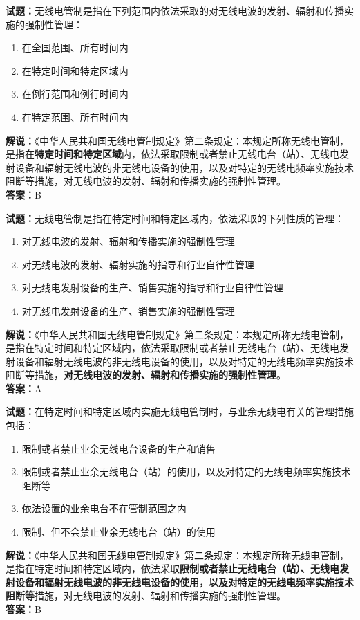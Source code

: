 \documentclass{ctexbook}
\begin{document}
\bigskip


\noindent\textbf{试题：}无线电管制是指在下列范围内依法采取的对无线电波的发射、辐射和传播实施的强制性管理：
\begin{enumerate}[leftmargin=3em]
\item 在全国范围、所有时间内
\item 在特定时间和特定区域内
\item 在例行范围和例行时间内
\item 在特定范围、所有时间内
\end{enumerate}
\noindent\textbf{解说：}《中华人民共和国无线电管制规定》第二条规定：本规定所称无线电管制，是指在\textbf{特定时间和特定区域}内，依法采取限制或者禁止无线电台（站）、无线电发射设备和辐射无线电波的非无线电设备的使用，以及对特定的无线电频率实施技术阻断等措施，对无线电波的发射、辐射和传播实施的强制性管理。\\\noindent\textbf{答案：}B



\bigskip


\noindent\textbf{试题：}无线电管制是指在特定时间和特定区域内，依法采取的下列性质的管理：
\begin{enumerate}[leftmargin=3em]
\item 对无线电波的发射、辐射和传播实施的强制性管理
\item 对无线电波的发射、辐射实施的指导和行业自律性管理
\item 对无线电发射设备的生产、销售实施的指导和行业自律性管理
\item 对无线电发射设备的生产、销售实施的强制性管理
\end{enumerate}
\noindent\textbf{解说：}《中华人民共和国无线电管制规定》第二条规定：本规定所称无线电管制，是指在特定时间和特定区域内，依法采取限制或者禁止无线电台（站）、无线电发射设备和辐射无线电波的非无线电设备的使用，以及对特定的无线电频率实施技术阻断等措施，\textbf{对无线电波的发射、辐射和传播实施的强制性管理}。\\\noindent\textbf{答案：}A



\bigskip


\noindent\textbf{试题：}在特定时间和特定区域内实施无线电管制时，与业余无线电有关的管理措施包括：
\begin{enumerate}[leftmargin=3em]
\item 限制或者禁止业余无线电台设备的生产和销售
\item 限制或者禁止业余无线电台（站）的使用，以及对特定的无线电频率实施技术阻断等
\item 依法设置的业余电台不在管制范围之内
\item 限制、但不会禁止业余无线电台（站）的使用
\end{enumerate}
\noindent\textbf{解说：}《中华人民共和国无线电管制规定》第二条规定：本规定所称无线电管制，是指在特定时间和特定区域内，依法采取\textbf{限制或者禁止无线电台（站）、无线电发射设备和辐射无线电波的非无线电设备的使用，以及对特定的无线电频率实施技术阻断等}措施，对无线电波的发射、辐射和传播实施的强制性管理。\\\noindent\textbf{答案：}B
\end{document}
